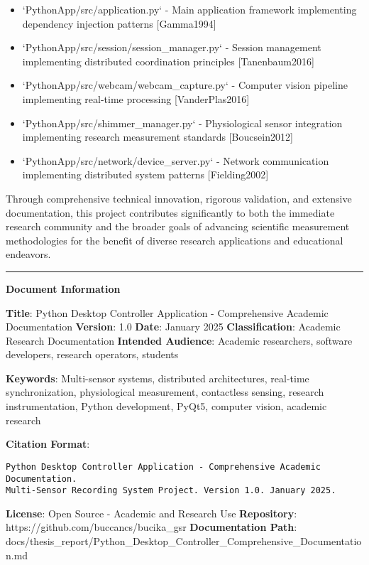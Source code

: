 \documentclass[12pt,a4paper]{article}
\begin{document}
\begin{itemize}
\item `PythonApp/src/application.py` - Main application framework implementing dependency injection patterns [Gamma1994]
\item `PythonApp/src/session/session_manager.py` - Session management implementing distributed coordination
  principles [Tanenbaum2016]
\item `PythonApp/src/webcam/webcam_capture.py` - Computer vision pipeline implementing real-time processing [VanderPlas2016]
\item `PythonApp/src/shimmer_manager.py` - Physiological sensor integration implementing research measurement
  standards [Boucsein2012]
\item `PythonApp/src/network/device_server.py` - Network communication implementing distributed system
  patterns [Fielding2002]

\end{itemize}
Through comprehensive technical innovation, rigorous validation, and extensive documentation, this project contributes
significantly to both the immediate research community and the broader goals of advancing scientific measurement
methodologies for the benefit of diverse research applications and educational endeavors.

\hrule

\textbf{Document Information}

\textbf{Title}: Python Desktop Controller Application - Comprehensive Academic Documentation  
\textbf{Version}: 1.0  
\textbf{Date}: January 2025  
\textbf{Classification}: Academic Research Documentation  
\textbf{Intended Audience}: Academic researchers, software developers, research operators, students

\textbf{Keywords}: Multi-sensor systems, distributed architectures, real-time synchronization, physiological measurement,
contactless sensing, research instrumentation, Python development, PyQt5, computer vision, academic research

\textbf{Citation Format}:

\begin{verbatim}
Python Desktop Controller Application - Comprehensive Academic Documentation. 
Multi-Sensor Recording System Project. Version 1.0. January 2025.
\end{verbatim}

\textbf{License}: Open Source - Academic and Research Use  
\textbf{Repository}: https://github.com/buccancs/bucika\_gsr  
\textbf{Documentation Path}: docs/thesis\_report/Python\_Desktop\_Controller\_Comprehensive\_Documentation.md
\end{document}
